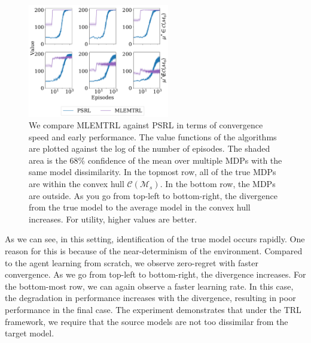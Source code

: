 \begin{figure}[h!]
   \centering
   \includegraphics[width=0.55\textwidth]{img/time_experiment.pdf}
   \caption{We compare MLEMTRL against PSRL in terms of convergence speed and early performance. The value functions of the algorithms are plotted against the log of the number of episodes. The shaded area is the $68\%$ confidence of the mean over multiple MDPs with the same model dissimilarity. In the topmost row, all of the true MDPs are within the convex hull $\mathcal{C}(\mathcal{M}_s)$. In the bottom row, the MDPs are outside. As you go from top-left to bottom-right, the divergence from the true model to the average model in the convex hull increases. For utility, higher values are better.}  \label{fig:time}
\end{figure}
As we can see, in this setting, identification of the true model occurs rapidly. One reason for this is because of the near-determinism of the environment. Compared to the agent learning from scratch, we observe zero-regret with faster convergence. As we go from top-left to bottom-right, the divergence increases. For the bottom-most row, we can again observe a faster learning rate. In this case, the degradation in performance increases with the divergence, resulting in poor performance in the final case. The experiment demonstrates that under the TRL framework, we require that the source models are not too dissimilar from the target model.


\iffalse
